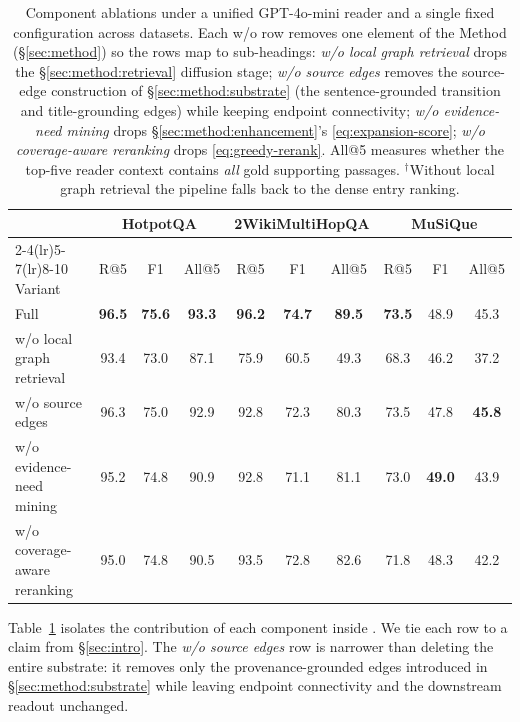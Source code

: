\begin{table}[t]
\centering
\small
\setlength{\tabcolsep}{4pt}
\begin{tabular}{lccc ccc ccc}
\toprule
& \multicolumn{3}{c}{HotpotQA} &
\multicolumn{3}{c}{2WikiMultiHopQA} &
\multicolumn{3}{c}{MuSiQue} \\
\cmidrule(lr){2-4}\cmidrule(lr){5-7}\cmidrule(lr){8-10}
Variant & R@5 & F1 & All@5 & R@5 & F1 & All@5 & R@5 & F1 & All@5 \\
\midrule
Full \methodname{} & \textbf{96.5} & \textbf{75.6} & \textbf{93.3}
& \textbf{96.2} & \textbf{74.7} & \textbf{89.5}
& \textbf{73.5} & 48.9 & 45.3 \\
\midrule
w/o local graph retrieval\rlap{$^{\dagger}$} & 93.4 & 73.0 & 87.1 & 75.9 & 60.5 & 49.3 & 68.3 & 46.2 & 37.2 \\
w/o source edges                              & 96.3 & 75.0 & 92.9 & 92.8 & 72.3 & 80.3 & 73.5 & 47.8 & \textbf{45.8} \\
w/o evidence-need mining                      & 95.2 & 74.8 & 90.9 & 92.8 & 71.1 & 81.1 & 73.0 & \textbf{49.0} & 43.9 \\
w/o coverage-aware reranking                  & 95.0 & 74.8 & 90.5 & 93.5 & 72.8 & 82.6 & 71.8 & 48.3 & 42.2 \\
\bottomrule
\end{tabular}
\caption{Component ablations under a unified GPT-4o-mini reader and
a single fixed configuration across datasets. Each w/o row removes
one element of the Method (\S\ref{sec:method}) so the rows map to
sub-headings: \emph{w/o local graph retrieval} drops the
\S\ref{sec:method:retrieval} diffusion stage; \emph{w/o source
edges} removes the source-edge construction of
\S\ref{sec:method:substrate} (the sentence-grounded transition and
title-grounding edges) while keeping endpoint connectivity; \emph{w/o
evidence-need mining} drops \S\ref{sec:method:enhancement}'s
\eqref{eq:expansion-score}; \emph{w/o coverage-aware reranking}
drops \eqref{eq:greedy-rerank}. All@5 measures whether the top-five
reader context contains \emph{all} gold supporting passages.
$^{\dagger}$Without local graph retrieval the pipeline falls back
to the dense entry ranking.}
\label{tab:ablation}
\end{table}

Table~\ref{tab:ablation} isolates the contribution of each
component inside \methodname{}. We tie each row to a claim from
\S\ref{sec:intro}. The \emph{w/o source edges} row is narrower than
deleting the entire substrate: it removes only the
provenance-grounded edges introduced in
\S\ref{sec:method:substrate} while leaving endpoint connectivity
and the downstream readout unchanged.

